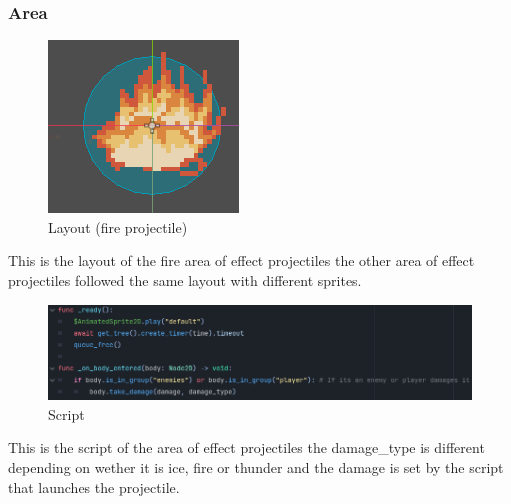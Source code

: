 \documentclass{article}
\begin{document}
        \subsubsection{Area}
        \begin{figure}[H]
                \centering
                \includegraphics[width = 0.9\columnwidth]{images/development/FireArea_layout.PNG}
                \caption{Layout (fire projectile)}
        \end{figure}
        This is the layout of the fire area of effect projectiles the other area of effect projectiles followed the same layout with different sprites.\\
        \begin{figure}[H]
                \centering
                \includegraphics[width = 0.9\columnwidth]{images/development/FireArea_script.PNG}
                \caption{Script}
        \end{figure}
        This is the script of the area of effect projectiles the damage\_type is different depending on wether it is ice, fire or thunder and the damage is set by the script that launches the projectile.\\ 
\end{document}
